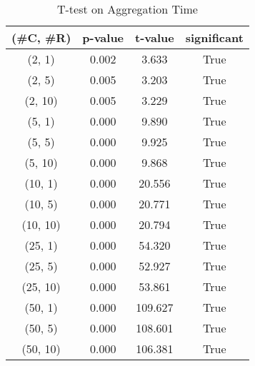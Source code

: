 \begin{table}[h]
\centering
\caption{T-test on Aggregation Time}
\label{tab:t-testAggregating}
\begin{tabular}{|c|c|c|c|}
\toprule
(\#C, \#R) &  p-value &  t-value &  significant \\
\midrule
  (2, 1) &    0.002 &    3.633 &         True \\
  (2, 5) &    0.005 &    3.203 &         True \\
 (2, 10) &    0.005 &    3.229 &         True \\
  (5, 1) &    0.000 &    9.890 &         True \\
  (5, 5) &    0.000 &    9.925 &         True \\
 (5, 10) &    0.000 &    9.868 &         True \\
 (10, 1) &    0.000 &   20.556 &         True \\
 (10, 5) &    0.000 &   20.771 &         True \\
(10, 10) &    0.000 &   20.794 &         True \\
 (25, 1) &    0.000 &   54.320 &         True \\
 (25, 5) &    0.000 &   52.927 &         True \\
(25, 10) &    0.000 &   53.861 &         True \\
 (50, 1) &    0.000 &  109.627 &         True \\
 (50, 5) &    0.000 &  108.601 &         True \\
(50, 10) &    0.000 &  106.381 &         True \\
\bottomrule
\end{tabular}
\end{table}
